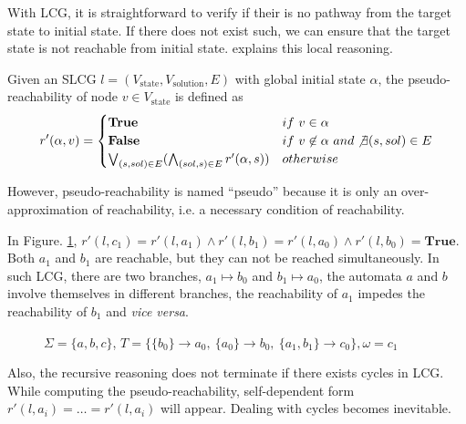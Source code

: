 \documentclass{entcs}
\newcommand{\acm}[3]{\{#1\}\rightarrow#2}
\begin{document}
With LCG, it is straightforward to verify if their is no pathway from the target state to initial state.
If there does not exist such, we can ensure that the target state is not reachable from initial state.
\cite{pauleve2012} explains this local reasoning.

\begin{definition}\label{defPseudoReach}
Given an SLCG $l=(V_{\mathrm{state}},V_{\mathrm{solution}},E)$ with global initial state $\alpha$, the pseudo-reachability of node $v\in V_{\mathrm{state}}$ is defined as
\begin{equation}
\nonumber
    r'(\alpha,v)=
    \begin{cases}
        \mathrm{\bf True} & {\rm if\ } v\in \alpha\\
        \mathrm{\bf False} & {\rm if\ } v\not\in \alpha\ {\rm and} \not\exists(s,sol) \in E\\
        \bigvee_{(s,sol) \in E}  (\bigwedge_{(sol,s)\in E} r'(\alpha,s)) & {\rm otherwise}
    \end{cases}
\end{equation}

\end{definition}

However, pseudo-reachability is named ``pseudo'' because it is only an over-approximation of reachability, i.e. a necessary condition of reachability.
\begin{example}
    In Figure. \ref{fig:limitation}, $r'(l,c_1)=r'(l,a_1)\land r'(l,b_1)=r'(l,a_0)\land r'(l,b_0)=\textbf{True}$. Both $a_1$ and $b_1$ are reachable, but they can not be reached simultaneously.
    In such LCG, there are two branches, $a_1\mapsto b_0$ and $b_1\mapsto a_0$, the automata $a$ and $b$ involve themselves in different branches, the reachability of $a_1$ impedes the reachability of $b_1$ and \textit{vice versa}.
\end{example}

\begin{figure}[ht]
    \centering
    
    \caption{$\Sigma=\{a,b,c\}$, $T=\{\acm{b_0}{a_0}{a_1},\ \acm{a_0}{b_0}{b_1},\ \acm{a_1,b_1}{c_0}{c_1}\},\omega=c_1$}
    \label{fig:limitation}
\end{figure}

Also, the recursive reasoning does not terminate if there exists cycles in LCG. 
While computing the pseudo-reachability, self-dependent form $r'(l,a_i)=\ldots=r'(l,a_i)$ will appear. 
Dealing with cycles becomes inevitable.
\end{document}
